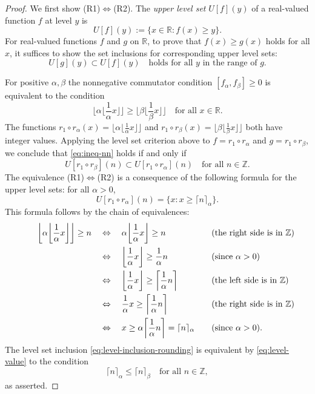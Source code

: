 \documentclass[11pt, letterpaper, reqno]{amsart}
\theoremstyle{definition}
\numberwithin{equation}{section}
\newcommand{\RR}{\ensuremath{\mathbb{R}}}
\newcommand{\ZZ}{\ensuremath{\mathbb{Z}}}
\newcommand{\floor}[1]{\lfloor{#1}\rfloor}
\newcommand{\bfloor}[1]{\bigg\lfloor{#1}\bigg\rfloor}
\newcommand{\ceil}[1]{\lceil{#1}\rceil}
\newcommand{\bceil}[1]{\bigg\lceil{#1}\bigg\rceil}
\begin{document}
\begin{proof} %
We first show (R1)$\Leftrightarrow$(R2).
The {\em upper level set} $U[f](y)$  of a real-valued function $f$ at level $y$ is
\[
U[f](y) := \{ x\in \RR : f(x) \ge y \}.
\]
For  real-valued functions $f$ and $g$ on $\RR$, to prove that $f(x) \ge g(x)$ holds for all $x$, it suffices to show the set inclusions for corresponding upper level sets:
\begin{equation}\label{eq:level-inclusion}
U[g](y) \subset U[f](y) \quad \mbox{holds for all $y$ in the range of $g$}.
\end{equation}

For positive $\alpha, \beta$ the  nonnegative commutator condition $[f_\alpha, f_\beta]\geq 0$
 is equivalent to  the condition 
 \begin{equation}\label{eq:ineq-nn}
\bfloor{\alpha \bfloor{\frac{1}{\alpha} x}} \geq \bfloor{\beta \bfloor{\frac{1}{\beta} x}}  
\quad\text{for all} \,\, x\in \RR.
\end{equation} 
The  functions $r_1\circ r_{\alpha}(x)= \floor{\alpha \floor{\frac{1}{\alpha} x}}$ and
 $r_1\circ r_{\beta}(x)= \floor{\beta \floor{\frac{1}{\beta} x}}$   
 both have integer values.   
Applying the level set criterion above to
 $f=r_1\circ r_{\alpha}$ and
 $g=r_1\circ r_{\beta}$, 
we   conclude that \eqref{eq:ineq-nn} 
holds if and only if 
\begin{equation}\label{eq:level-inclusion-rounding}
U [r_1\circ r_\beta](n)\subset U [r_1\circ r_\alpha](n) \quad \mbox{for all  $n \in \ZZ$.}
\end{equation}
The equivalence (R1)$\Leftrightarrow$(R2) is  a consequence of 
the following  formula for the upper level sets: 
for all ${ \alpha > 0 }$,  
\begin{equation}\label{eq:level-value}
U[r_1\circ r_{\alpha}](n) = \{ x : x \ge \ceil{n}_{\alpha}\}.
\end{equation}
This formula follows by the chain of equivalences:
\begin{align}
\label{eq:rounding-essential}
\qquad  \bfloor{ \alpha \bfloor{ \frac1\alpha x}}  \geq n
& \quad\Leftrightarrow\quad  \alpha \bfloor{ \frac1\alpha x}  \geq n 
    && \quad \mbox{(the right side is in $\ZZ$)} \notag\\
& \quad\Leftrightarrow\quad    \bfloor{ \frac1\alpha x} \geq \frac{1}{\alpha} n  
    && \quad \mbox{(since $\alpha > 0$)} \notag \\
& \quad\Leftrightarrow\quad   \bfloor{ \frac1\alpha x} \geq \bceil{ \frac{1}{\alpha} n }   
    &&  \quad \mbox{(the left side is in $\ZZ $)} \\
& \quad\Leftrightarrow\quad   \frac1\alpha x \geq \bceil{ \frac{1}{\alpha} n }   
    && \quad \mbox{(the right side is in $\ZZ$)} \notag \\
&\quad\Leftrightarrow\quad   x \geq \alpha \bceil{ \frac{1}{\alpha} n }  = \ceil{ n}_{\alpha} 
    && \quad \mbox{(since $\alpha >0$)}. \notag
\end{align} 
The level set inclusion \eqref{eq:level-inclusion-rounding}
is equivalent  by \eqref{eq:level-value} to the condition
\[ 
\ceil{n}_{\alpha} \le \ceil{ n }_{\beta} \quad \mbox{for all $n \in \ZZ$},
\]
as asserted. 


\end{proof}
\end{document}
